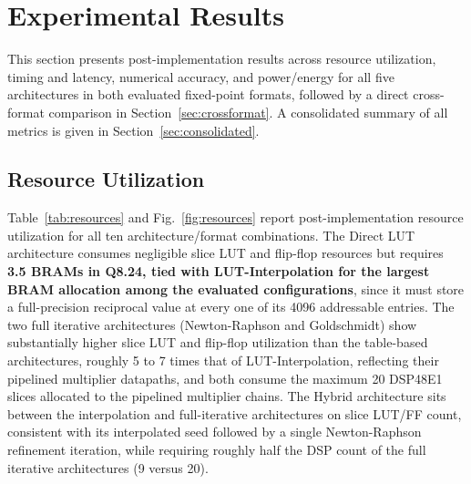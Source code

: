\documentclass[manuscript,screen,review]{acmart}
\begin{document}
\section{Experimental Results}
\label{sec:results}

This section presents post-implementation results across resource utilization, timing and latency, numerical accuracy, and power/energy for all five architectures in both evaluated fixed-point formats, followed by a direct cross-format comparison in Section~\ref{sec:crossformat}. A consolidated summary of all metrics is given in Section~\ref{sec:consolidated}.

\subsection{Resource Utilization}

Table~\ref{tab:resources} and Fig.~\ref{fig:resources} report post-implementation resource utilization for all ten architecture/format combinations. The Direct LUT architecture consumes negligible slice LUT and flip-flop resources but requires \textbf{3.5 BRAMs in Q8.24, tied with LUT-Interpolation for the largest BRAM allocation among the evaluated configurations}, since it must store a full-precision reciprocal value at every one of its 4096 addressable entries. The two full iterative architectures (Newton-Raphson and Goldschmidt) show substantially higher slice LUT and flip-flop utilization than the table-based architectures, roughly 5 to 7 times that of LUT-Interpolation, reflecting their pipelined multiplier datapaths, and both consume the maximum 20 DSP48E1 slices allocated to the pipelined multiplier chains. The Hybrid architecture sits between the interpolation and full-iterative architectures on slice LUT/FF count, consistent with its interpolated seed followed by a single Newton-Raphson refinement iteration, while requiring roughly half the DSP count of the full iterative architectures (9 versus 20).
\end{document}
